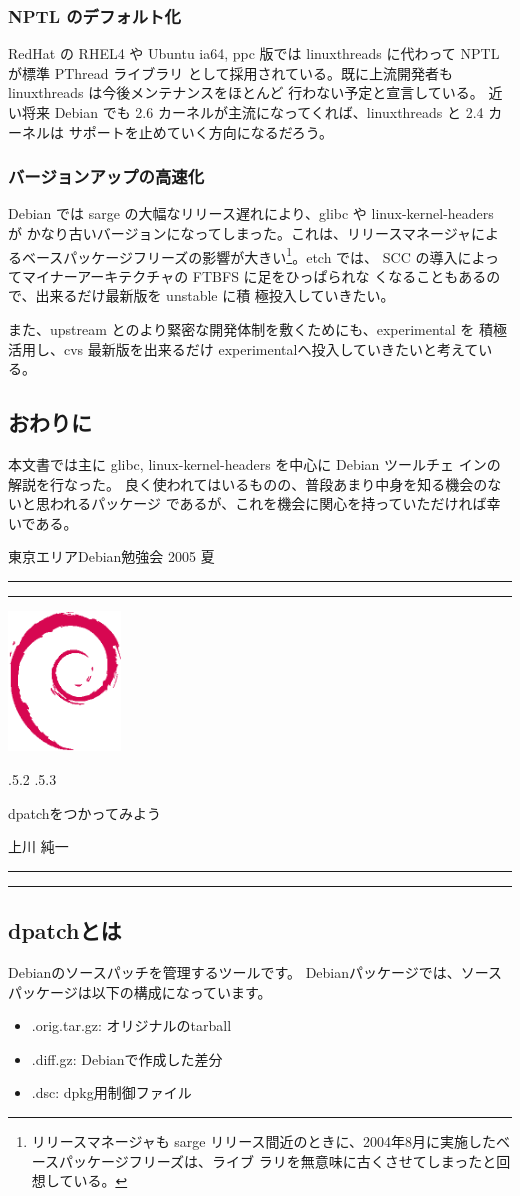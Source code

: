 \documentclass[mingoth,a4paper]{jsarticle}
\makeatletter
\renewcommand{\section}{\@startsection{section}{1}{\z@}%
    {\Cvs \@plus.5\Cdp \@minus.2\Cdp}%
    {.5\Cvs \@plus.3\Cdp}%
    {\normalfont\Large\headfont\raggedright\centering}} %
\newcommand{\dancersection}[2]{%
\newpage
東京エリアDebian勉強会 2005 夏
\hrule
\vspace{0.5mm}
\hrule
\hfill{}\includegraphics[width=3cm]{image200502/openlogo-nd.eps}\\
\vspace{-4cm}
\begin{center}
  \section{#1}
\end{center}
\hfill{}#2\hspace{3cm}\space\\
\hrule
\hrule
\vspace{1cm}
}
\makeatother
\begin{document}
  \subsubsection{NPTL のデフォルト化}

    RedHat の RHEL4 や Ubuntu ia64, ppc 版では linuxthreads に代わって
    NPTL が標準 PThread ライブラリ
    として採用されている。既に上流開発者も linuxthreads は今後メンテナンスをほとんど
    行わない予定と宣言している。
    近い将来 Debian でも 2.6 カーネルが主流になってくれば、linuxthreads と 2.4 カーネルは
    サポートを止めていく方向になるだろう。

  \subsubsection{バージョンアップの高速化}

    Debian では sarge の大幅なリリース遅れにより、glibc や linux-kernel-headers が
    かなり古いバージョンになってしまった。これは、リリースマネージャによ
    るベースパッケージフリーズの影響が大きい\footnote{リリースマネージャも sarge 
    リリース間近のときに、2004年8月に実施したベースパッケージフリーズは、ライブ
    ラリを無意味に古くさせてしまったと回想している。}。etch では、
    SCC の導入によってマイナーアーキテクチャの FTBFS に足をひっぱられな
    くなることもあるので、出来るだけ最新版を unstable に積
    極投入していきたい。

    また、upstream とのより緊密な開発体制を敷くためにも、experimental を
    積極活用し、cvs 最新版を出来るだけ experimentalへ投入していきたいと考えている。

\subsection{おわりに}

  本文書では主に glibc, linux-kernel-headers を中心に Debian ツールチェ
  インの解説を行なった。
  良く使われてはいるものの、普段あまり中身を知る機会のないと思われるパッケージ
  であるが、これを機会に関心を持っていただければ幸いである。

\dancersection{dpatchをつかってみよう}{上川 純一}
\label{sec:dpatch}

\subsection{dpatchとは}

 Debianのソースパッチを管理するツールです。 Debianパッケージでは、ソースパッケージは以下の構成になっています。
\begin{itemize}
    \item .orig.tar.gz: オリジナルのtarball
    \item .diff.gz: Debianで作成した差分
    \item .dsc: dpkg用制御ファイル
\end{itemize}
\end{document}
